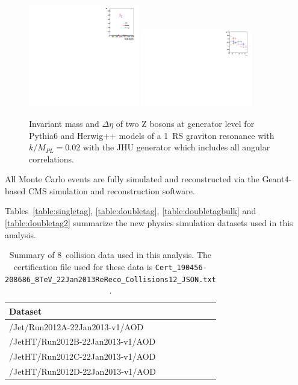 \begin{figure}[htb]
\begin{center}
\includegraphics[width=0.43\textwidth]{EXO-12-024/figs/comparison-jhu-pythia-herwigg/MX.pdf}
\includegraphics[width=0.43\textwidth]{EXO-12-024/figs/comparison-jhu-pythia-herwigg/delta-y.pdf}
\end{center}
\caption{Invariant mass and $\Delta\eta$ of two Z bosons at generator level for Pythia6 and Herwig++ models of a 1~\TeVcc RS graviton resonance with $k/M_{PL}=0.02$ with the JHU generator which includes all angular correlations.}
\label{fig:compare-Herwig++-Pythia6}
\end{figure}

All Monte Carlo events are fully simulated and reconstructed via the Geant4-based CMS simulation
 and reconstruction software.

Tables~\ref{table:singletag}, \ref{table:doubletag}, \ref{table:doubletagbulk} and \ref{table:doubletag2} summarize the new 
physics simulation datasets used in this analysis. 


\begin{table}[htb]
\begin{center}
\begin{tabular}{ |l| }
\hline
Dataset                                 \\
\hline
/Jet/Run2012A-22Jan2013-v1/AOD  \\
/JetHT/Run2012B-22Jan2013-v1/AOD  \\
/JetHT/Run2012C-22Jan2013-v1/AOD  \\
/JetHT/Run2012D-22Jan2013-v1/AOD  \\
\hline
\end{tabular} 
\end{center}
\caption{Summary of 8~\TeVcc collision data used in this analysis. 
The certification file used for these data is 
{\tt Cert\_190456-208686\_8TeV\_22Jan2013ReReco\_Collisions12\_JSON.txt
}.
}
\label{table:dataset}
\end{table}


